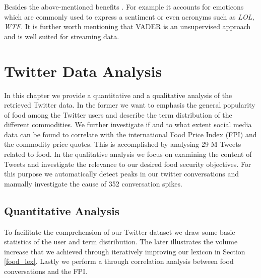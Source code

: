 Besides the above-mentioned benefits  \cite{hutton14}. For example it accounts for emoticons which are commonly used to express a sentiment or even acronyms such as \emph{LOL, WTF}. It is further worth mentioning that VADER is an unsupervised approach and is well suited for streaming data. 


\chapter{Twitter Data Analysis}
\label{4}

In this chapter we provide a quantitative and a qualitative analysis of the retrieved Twitter data. In the former we want to emphasis the general popularity of food among the Twitter users and describe the term distribution of the different commodities. We further investigate if and to what extent social media data can be found to correlate with the international Food Price Index (FPI) and the commodity price quotes. This is accomplished by analysing 29 M Tweets related to food. In the qualitative analysis we focus on examining the content of Tweets and investigate the relevance to our desired food security objectives. For this purpose we automatically detect peaks in our twitter conversations and manually investigate the cause of 352 conversation spikes. 

\section{Quantitative Analysis}

To facilitate the comprehension of our Twitter dataset we draw some basic statistics of the user and term distribution. The later illustrates the volume increase that we achieved through iteratively improving our lexicon in Section \ref{food_lex}. Lastly we perform a through correlation analysis between food conversations and the FPI. 

